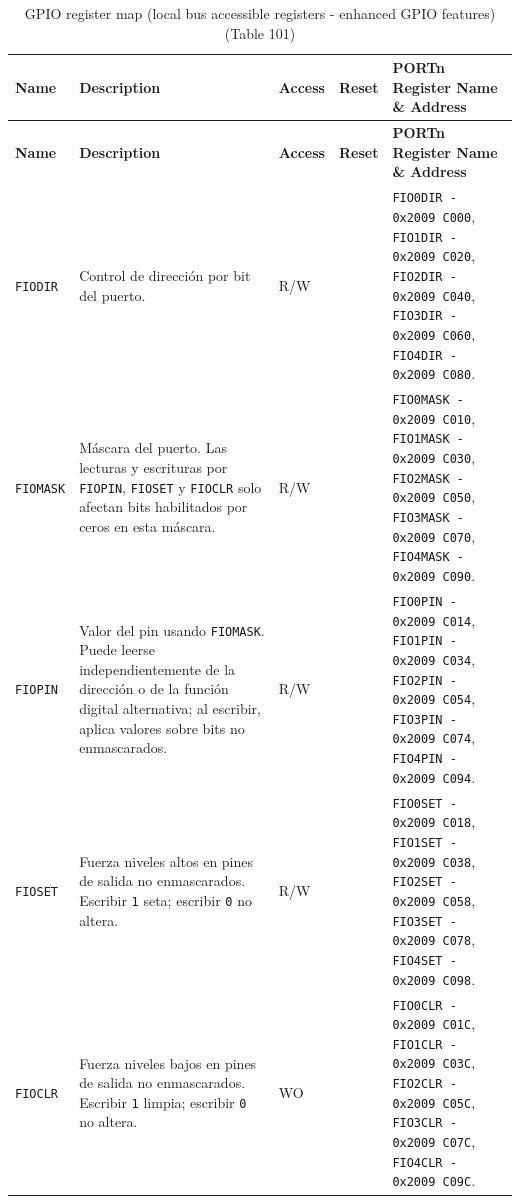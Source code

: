 \renewcommand{\arraystretch}{1.12}
\setlength{\LTleft}{0pt}
\setlength{\LTright}{0pt}

\begin{longtable}{|>{\raggedright\arraybackslash}p{}|>{\raggedright\arraybackslash}p{}|>{\centering\arraybackslash}p{}|>{\centering\arraybackslash}p{}|>{\raggedright\arraybackslash}p{}|}
\caption{GPIO register map (local bus accessible registers - enhanced GPIO features) (Table 101)} \\
\hline
\textbf{Name} & \textbf{Description} & \textbf{Access} & \textbf{Reset} & \textbf{PORTn Register Name \& Address} \\
\hline
\endfirsthead
\hline
\textbf{Name} & \textbf{Description} & \textbf{Access} & \textbf{Reset} & \textbf{PORTn Register Name \& Address} \\
\hline
\endhead
\texttt{FIODIR} & Control de dirección por bit del puerto. & R/W & 0 & \texttt{FIO0DIR - 0x2009 C000}, \texttt{FIO1DIR - 0x2009 C020}, \texttt{FIO2DIR - 0x2009 C040}, \texttt{FIO3DIR - 0x2009 C060}, \texttt{FIO4DIR - 0x2009 C080}. \\
\hline
\texttt{FIOMASK} & Máscara del puerto. Las lecturas y escrituras por \texttt{FIOPIN}, \texttt{FIOSET} y \texttt{FIOCLR} solo afectan bits habilitados por ceros en esta máscara. & R/W & 0 & \texttt{FIO0MASK - 0x2009 C010}, \texttt{FIO1MASK - 0x2009 C030}, \texttt{FIO2MASK - 0x2009 C050}, \texttt{FIO3MASK - 0x2009 C070}, \texttt{FIO4MASK - 0x2009 C090}. \\
\hline
\texttt{FIOPIN} & Valor del pin usando \texttt{FIOMASK}. Puede leerse independientemente de la dirección o de la función digital alternativa; al escribir, aplica valores sobre bits no enmascarados. & R/W & 0 & \texttt{FIO0PIN - 0x2009 C014}, \texttt{FIO1PIN - 0x2009 C034}, \texttt{FIO2PIN - 0x2009 C054}, \texttt{FIO3PIN - 0x2009 C074}, \texttt{FIO4PIN - 0x2009 C094}. \\
\hline
\texttt{FIOSET} & Fuerza niveles altos en pines de salida no enmascarados. Escribir \texttt{1} seta; escribir \texttt{0} no altera. & R/W & 0 & \texttt{FIO0SET - 0x2009 C018}, \texttt{FIO1SET - 0x2009 C038}, \texttt{FIO2SET - 0x2009 C058}, \texttt{FIO3SET - 0x2009 C078}, \texttt{FIO4SET - 0x2009 C098}. \\
\hline
\texttt{FIOCLR} & Fuerza niveles bajos en pines de salida no enmascarados. Escribir \texttt{1} limpia; escribir \texttt{0} no altera. & WO & 0 & \texttt{FIO0CLR - 0x2009 C01C}, \texttt{FIO1CLR - 0x2009 C03C}, \texttt{FIO2CLR - 0x2009 C05C}, \texttt{FIO3CLR - 0x2009 C07C}, \texttt{FIO4CLR - 0x2009 C09C}. \\
\hline
\end{longtable}

